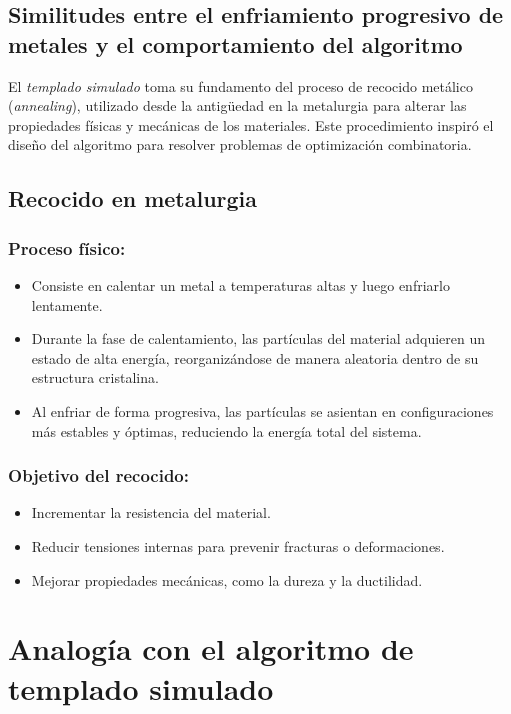 \documentclass{article}
\begin{document}
\subsection{Similitudes entre el enfriamiento progresivo de metales y el comportamiento del algoritmo}

El \textit{templado simulado} toma su fundamento del proceso de recocido metálico (\textit{annealing}), utilizado desde la antigüedad en la metalurgia para alterar las propiedades físicas y mecánicas de los materiales. Este procedimiento inspiró el diseño del algoritmo para resolver problemas de optimización combinatoria.

\subsection{Recocido en metalurgia}

\subsubsection{Proceso físico:}
\begin{itemize}
    \item Consiste en calentar un metal a temperaturas altas y luego enfriarlo lentamente.
    \item Durante la fase de calentamiento, las partículas del material adquieren un estado de alta energía, reorganizándose de manera aleatoria dentro de su estructura cristalina.
    \item Al enfriar de forma progresiva, las partículas se asientan en configuraciones más estables y óptimas, reduciendo la energía total del sistema.
\end{itemize}

\subsubsection{Objetivo del recocido:}
\begin{itemize}
    \item Incrementar la resistencia del material.
    \item Reducir tensiones internas para prevenir fracturas o deformaciones.
    \item Mejorar propiedades mecánicas, como la dureza y la ductilidad.
\end{itemize}

\section{Analogía con el algoritmo de templado simulado}
\end{document}
